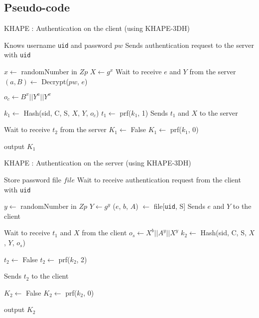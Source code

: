 \documentclass[../report.tex]{subfiles}
\begin{document}
\chapter{}
\section{Pseudo-code}


\begin{algorithm}
\caption{KHAPE : Authentication on the client (using KHAPE-3DH)}
\label{euclid}
\begin{algorithmic}
\Require Knows username \verb|uid| and password $pw$
\State Sends authentication request to the server with \verb|uid|

\State $x \gets$ randomNumber in $Zp$
\State $X \gets g^x$
\State Wait to receive $e$ and $Y$ from the server
\State $(a, B) \gets$ Decrypt($pw$, $e$)

    \State $o_c \gets B^x || Y^a || Y^x$

\State $k_1 \gets$ Hash(sid, C, S, $X$, $Y$, $o_c$)
\State $t_1 \gets$ prf($k_1$, 1)
\State Sends $t_1$ and $X$ to the server


\State Wait to receive $t_2$ from the server
    \State $K_1 \gets$ False
\Else
    \State $K_1 \gets$ prf($k_1$, 0)
\EndIf

\State output $K_1$
\end{algorithmic}
\end{algorithm}


\begin{algorithm}
\caption{KHAPE : Authentication on the server (using KHAPE-3DH)}
\label{euclid}
\begin{algorithmic}
\Require Store password file $file$
\State Wait to receive authentication request from the client with \verb|uid|

\State $y \gets$ randomNumber in $Zp$
\State $Y \gets g^y$
\State ($e$, $b$, $A$) $\gets$ file[\verb|uid|, S] %
\State Sends $e$ and $Y$ to the client


\State Wait to receive $t_1$ and $X$ from the client
\State $o_s \gets X^b || A^y || X^y$
\State $k_2 \gets$ Hash(sid, C, S, $X$, $Y$, $o_s$)


    \State $t_2 \gets$ False
\Else
    \State $t_2 \gets$ prf($k_2$, 2)
\EndIf


\State Sends $t_2$ to the client


    \State $K_2 \gets$ False
\Else
    \State $K_2 \gets$ prf($k_2$, 0)
\EndIf

\State output $K_2$
\end{algorithmic}
\end{algorithm}
\end{document}
